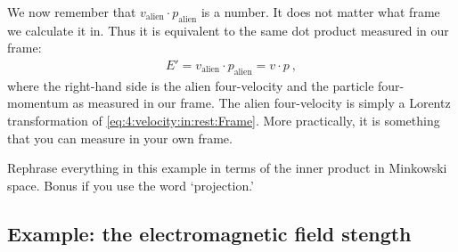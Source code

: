\documentclass[12pt]{article}
\begin{document}
We now remember that $v_\text{alien}\cdot p_\text{alien}$ is a number. It does not matter what frame we calculate it in. Thus it is equivalent to the same dot product measured in our frame:
\begin{align}
E'=
    v_\text{alien}\cdot p_\text{alien} = v\cdot p \ ,
\end{align}
where the right-hand side is the alien four-velocity and the particle four-momentum as measured in our frame. The alien four-velocity is simply a Lorentz transformation of \eqref{eq:4:velocity:in:rest:Frame}. More practically, it is something that you can measure in your own frame. 


\begin{exercise}
Rephrase everything in this example in terms of the inner product in Minkowski space. Bonus if you use the word `projection.'
\end{exercise}




\subsection{Example: the electromagnetic field stength}
\end{document}
